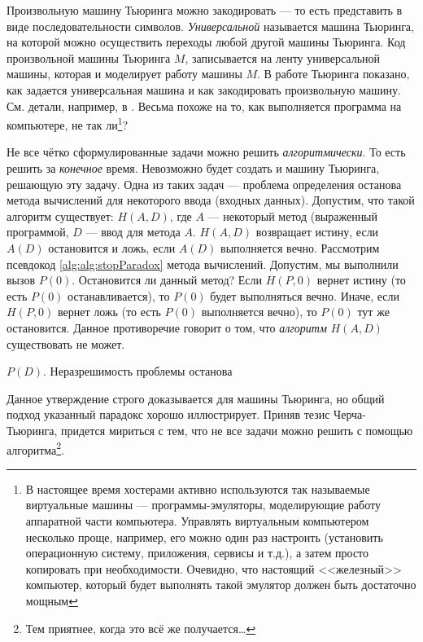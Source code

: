 Произвольную машину Тьюринга можно закодировать --- то есть представить в виде последовательности символов. \emph{Универсальной} называется машина Тьюринга, на которой можно осуществить переходы любой другой машины Тьюринга. Код произвольной машины Тьюринга $M$, записывается на ленту универсальной машины, которая и моделирует работу машины $M$. В работе Тьюринга показано, как задается универсальная машина и как закодировать произвольную машину. См. детали, например, в \cite{bib:mcconnel:alghorithmAnalysis}. Весьма похоже на то, как выполняется программа на компьютере, не так ли\footnote{В настоящее время хостерами активно используются так называемые виртуальные машины --- программы-эмуляторы, моделирующие работу аппаратной части компьютера. Управлять виртуальным компьютером несколько проще, например, его можно один раз настроить (установить операционную систему, приложения, сервисы и т.д.), а затем просто копировать при необходимости. Очевидно, что настоящий <<железный>> компьютер, который будет выполнять такой эмулятор должен быть достаточно мощным}?

Не все чётко сформулированные задачи можно решить \emph{алгоритмически}. То есть решить за \emph{конечное} время. Невозможно будет создать и машину Тьюринга, решающую эту задачу. Одна из таких задач --- проблема определения останова метода вычислений для некоторого ввода (входных данных). Допустим, что такой алгоритм существует: $H(A,D)$, где $A$ --- некоторый метод (выраженный программой, $D$ --- ввод для метода $A$. $H(A,D)$ возвращает истину, если $A(D)$ остановится и ложь, если $A(D)$ выполняется вечно. Рассмотрим псевдокод \ref{alg:alg:stopParadox} метода вычислений. Допустим, мы выполнили вызов $P(0)$. Остановится ли данный метод? Если $H(P,0)$ вернет истину (то есть $P(0)$ останавливается), то $P(0)$ будет выполняться вечно. Иначе, если $H(P,0)$ вернет ложь (то есть $P(0)$ выполняется вечно), то $P(0)$ тут же остановится. Данное противоречие говорит о том, что \emph{алгоритм} $H(A,D)$ существовать не может.
\begin{algorithm}
    \caption{$P(D)$. Неразрешимость проблемы останова}
    \label{alg:alg:stopParadox}
    \begin{algorithmic}[1]
        
            \WHILE{\TRUE}
                \STATE{}
            \ENDWHILE
        \ENDIF
    \end{algorithmic}
\end{algorithm}
Данное утверждение строго доказывается для машины Тьюринга, но общий подход указанный парадокс хорошо  иллюстрирует. Приняв тезис Черча-Тьюринга, придется мириться с тем, что не все задачи можно решить с помощью алгоритма\footnote{Тем приятнее, когда это всё же получается\ldots}.


